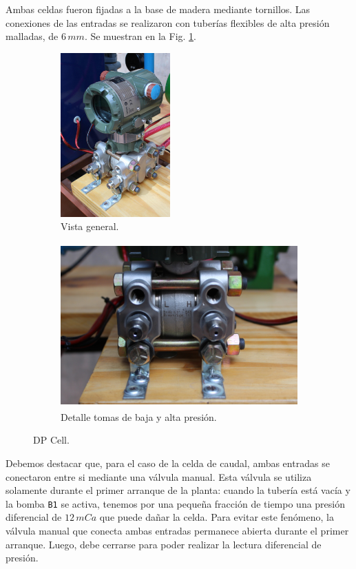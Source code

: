 Ambas celdas fueron fijadas a la base de madera mediante tornillos.
Las conexiones de las entradas se realizaron con tuberías flexibles de alta
presión malladas, de $6\,mm$. Se muestran en la Fig. \ref{fig:dpcelfig}.

\begin{figure}[t]
        \centering
        \begin{subfigure}[b]{0.31\textwidth}
        \centering
\includegraphics[height=6.3cm]
	{Cap2-DisenoEnsamblado/images/dpcell1.JPG}
	\caption{Vista general.}
        \end{subfigure}%
        \hfil
        \begin{subfigure}[b]{0.69\textwidth}
        \centering
\includegraphics[height=6.3cm]
	{Cap2-DisenoEnsamblado/images/dpcell2.JPG}
	\caption{Detalle tomas de baja y alta presión.}
        \end{subfigure}
        \caption{DP Cell.}
        \label{fig:dpcelfig}
\end{figure}

Debemos destacar que, para el caso de la celda de caudal, ambas
entradas se conectaron entre si mediante una válvula manual.
Esta válvula se utiliza solamente durante el primer arranque de la planta:
cuando la tubería está vacía y la bomba \verb|B1| se activa, tenemos por una
pequeña
fracción de tiempo una presión diferencial de $12\,mCa$ que puede dañar la
celda.
Para evitar este fenómeno, la válvula manual que conecta ambas entradas
permanece abierta durante el primer arranque.
Luego, debe cerrarse para poder realizar la lectura diferencial de presión.

